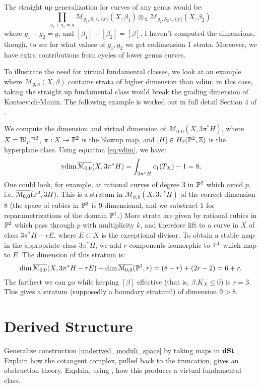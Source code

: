 \begin{rem}
The straight up generalization for curves of any genus would be:
\[\coprod_{g_1 + g_2 = g} \mathcal{M}_{g_1,S_1\cup\{x\}}(X,\beta_1) \otimes_{X}  \mathcal{M}_{g_2,S_2\cup\{x\}}(X,\beta_2).	\]
where $g_1 + g_2 = g$, and $[\beta_1] + [\beta_2] = [\beta]$. I haven't computed the dimensions, though, to see for what values
of $g_1, g_2$ we get codimension 1 strata. Moreover, we have extra contributions from cycles of lower genus curves.
\end{rem}

To illustrate the need for virtual fundamental classes, we look at an example where $\overline{\mathcal{M}}_{g,n}(X,\beta)$
contains strata of higher dimension than $\operatorname{vdim}$; in this case, taking the straight up fundamental class would break
the grading dimension of Kontsevich-Manin.
The following example is worked out in full detail Section 4 of \cite{nabijou}.

\begin{eg}
We compute the dimension and virtual dimension of $\overline{ \mathcal{M}_{0,0}}(X, 3\pi^*H)$,
where $X = \operatorname{Bl}_p \mathbb P^2$, $\pi: X \to \mathbb P^2$ is the blowup map, and $[H] \in H_2(\mathbb P^2,\mathbb Z)$ is the hyperplane class.
Using equation \ref{eq:vdim}, we have:
\[	\operatorname{vdim} \overline{ \mathcal{M}_{0,0}}(X, 3\pi^*H) = \int_{3\pi^*H} c_1(T_X) - 1 = 8.	\]
One could look, for example, at rational curves of degree 3 in $\mathbb P^2$ which avoid $p$, i.e.
$\overline{ \mathcal{M}_{0,0}}(\mathbb P^2, 3H)$. This is a stratum in $\overline{ \mathcal{M}_{0,0}}(X, 3\pi^*H)$ of the correct dimension 8
(the space of cubics in $\mathbb P^2$ is 9-dimensional, and we substract 1 for reparametrizations of the domain $\mathbb P^1$.)
More strata are given by rational cubics in $\mathbb P^2$ which pass through $p$ with multiplicity $k$, and therefore 
lift to a curve in $X$ of class $3\pi^*H - rE$, where $E \subset X$ is the exceptional divisor. To obtain
a stable map in the appropriate class $3\pi^*H$, we add $r$ components isomorphic to $\mathbb P^1$ which map to $E$.
The dimension of this stratum is:
\[	\dim \overline{ \mathcal{M}_{0,0}}(X,3\pi^*H - rE) + \dim \overline{ \mathcal{M}_{0,0}}(\mathbb P^1,r) = (8-r) + (2r-2) = 6+r.	\]
The farthest we can go while keeping $[\beta]$ effective (that is, $\beta . K_X \leq 0$) is $r=3$. This gives a stratum
(supposedly a boundary stratum!) of dimension $9>8$.
\end{eg}



\section{Derived Structure}
\label{sect:stable_derived}

Generalize construction \ref{underived_moduli_space} by taking maps in $\mathbf{dSt}$. Explain how the cotangent complex, pulled back
to the truncation, gives an obstruction theory. Explain, using \cite{Behrend_Intrinsic_normal_cone_1997}, 
how this produces a virtual fundamental class.